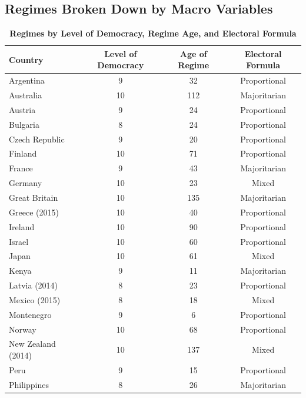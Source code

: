 \documentclass[12pt, titlepage]{article}
\newcommand\tb{\textbf}
\begin{document}
\clearpage


\let\svaddcontentsline\addcontentsline
\renewcommand\addcontentsline[3]{%
	\ifthenelse{\equal{#1}{lof}}{}%
	{\ifthenelse{\equal{#1}{lot}}{}{\svaddcontentsline{#1}{#2}{#3}}}}


\appendixtitleon
\appendixtitletocon

\begin{appendices}
	
\section{Regimes Broken Down by Macro Variables}
\label{AppendixC}

\begin{table} [h!]
	\centering
	\caption{\tb{Regimes by Level of Democracy, Regime Age, and Electoral Formula}}
	\begin{tabulary}{\linewidth}{l c c c}
		\hline
		\tb{Country} & \tb{Level of Democracy} & \tb{Age of Regime} & \tb{Electoral Formula} \\
		\hline
		Argentina&9&32&Proportional \\
		Australia& 10&112&Majoritarian \\
		Austria&9&24&Proportional\\
		Bulgaria&8&24&Proportional\\
		Czech Republic&9&20&Proportional \\
		Finland&10&71& Proportional \\
		France&9&43&Majoritarian \\
		Germany&10&23&Mixed \\
		Great Britain&10&135&Majoritarian \\
		Greece (2015)&10&40&Proportional \\
		Ireland&10&90&Proportional \\
		Israel&10&60&Proportional \\
		Japan&10&61&Mixed\\
		Kenya&9&11&Majoritarian \\
		Latvia (2014)&8&23&Proportional\\
		Mexico (2015)& 8&18&Mixed\\
		Montenegro&9&6&Proportional\\
		Norway&10&68&Proportional\\
		New Zealand (2014)& 10& 137& Mixed\\
		Peru&9&15&Proportional\\
		Philippines&8&26&Majoritarian\\

\end{tabulary}
\end{table}
\end{appendices}
\end{document}
